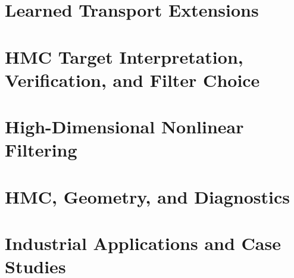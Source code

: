 \documentclass[12pt,a4paper,openany]{book}
\begin{document}
\part{Learned Transport Extensions}




\part{HMC Target Interpretation, Verification, and Filter Choice}




\part{High-Dimensional Nonlinear Filtering}









\part{HMC, Geometry, and Diagnostics}















\part{Industrial Applications and Case Studies}







\end{document}

